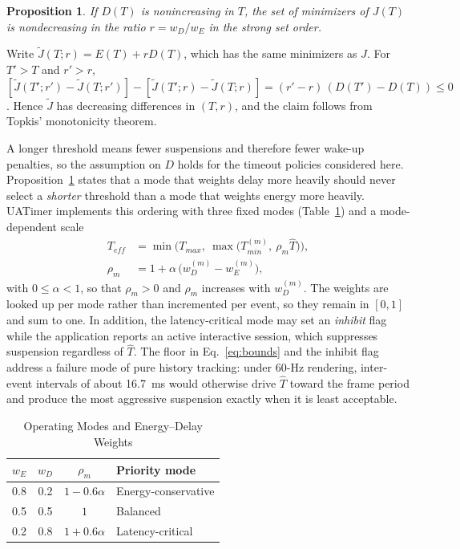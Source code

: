 \documentclass[journal]{IEEEtran}
\newtheorem{proposition}{Proposition}
\begin{document}
\begin{proposition}
\label{prop:monotone}
If $D(T)$ is nonincreasing in $T$, the set of minimizers of $J(T)$ is nondecreasing in the ratio $r=w_D/w_E$ in the strong set order.
\end{proposition}
\begin{IEEEproof}
Write $\tilde J(T;r)=E(T)+rD(T)$, which has the same minimizers as $J$. For $T'>T$ and $r'>r$,
$[\tilde J(T';r')-\tilde J(T;r')]-[\tilde J(T';r)-\tilde J(T;r)]=(r'-r)\,(D(T')-D(T))\le 0$.
Hence $\tilde J$ has decreasing differences in $(T,r)$, and the claim follows from Topkis' monotonicity theorem.
\end{IEEEproof}

A longer threshold means fewer suspensions and therefore fewer wake-up penalties, so the assumption on $D$ holds for the timeout policies considered here. Proposition~\ref{prop:monotone} states that a mode that weights delay more heavily should never select a \emph{shorter} threshold than a mode that weights energy more heavily. UATimer implements this ordering with three fixed modes (Table~\ref{tab:weights}) and a mode-dependent scale
\begin{align}
T_{eff}&=\min\!\big(T_{max},\ \max\big(T_{min}^{(m)},\ \rho_m\hat T\big)\big), \label{eq:teff}\\
\rho_m&=1+\alpha\,\big(w_D^{(m)}-w_E^{(m)}\big), \label{eq:rho}
\end{align}
with $0\le\alpha<1$, so that $\rho_m>0$ and $\rho_m$ increases with $w_D^{(m)}$. The weights are looked up per mode rather than incremented per event, so they remain in $[0,1]$ and sum to one. In addition, the latency-critical mode may set an \emph{inhibit} flag while the application reports an active interactive session, which suppresses suspension regardless of $\hat T$. The floor in Eq.~\eqref{eq:bounds} and the inhibit flag address a failure mode of pure history tracking: under 60-Hz rendering, inter-event intervals of about 16.7~ms would otherwise drive $\hat T$ toward the frame period and produce the most aggressive suspension exactly when it is least acceptable.

\begin{table}[t]
\caption{Operating Modes and Energy--Delay Weights}
\label{tab:weights}
\centering
\begin{tabular}{cccl}
\toprule
$w_E$ & $w_D$ & $\rho_m$ & Priority mode \\
\midrule
0.8 & 0.2 & $1-0.6\alpha$ & Energy-conservative \\
0.5 & 0.5 & $1$ & Balanced \\
0.2 & 0.8 & $1+0.6\alpha$ & Latency-critical \\
\bottomrule
\end{tabular}
\end{table}
\end{document}
